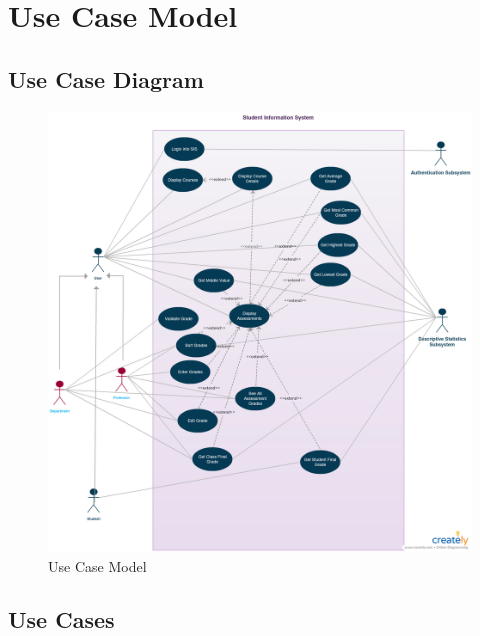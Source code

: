 \documentclass[11pt]{article}
\begin{document}
\newpage
\section{Use Case Model}

\subsection{Use Case Diagram}

\begin{figure}[h!]
	\centering
		\includegraphics[width=\textwidth]{usecasediagram.png}
	\caption{Use Case Model}
	\label{fig:usecasemodel}
\end{figure}

\subsection{Use Cases}

\end{document}
